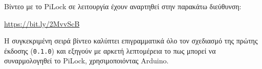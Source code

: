 Βίντεο με το PiLock σε λειτουργία έχουν αναρτηθεί στην παρακάτω διεύθυνση:

\url{https://bit.ly/2MvvScB}

Η συγκεκριμένη σειρά βίντεο καλύπτει επιγραμματικά όλο τον σχεδιασμό της πρώτης έκδοσης (\verb|0.1.0|) και εξηγούν με αρκετή λεπτομέρεια το πως μπορεί να συναρμολογηθεί το PiLock, χρησιμοποιόντας Arduino.